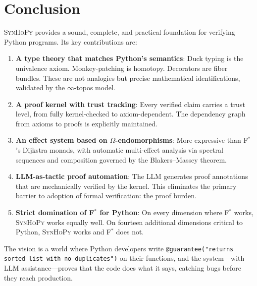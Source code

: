 \documentclass[11pt,a4paper]{report}
\theoremstyle{definition}
\theoremstyle{plain}
\newcommand{\fstar}{F$^{*}$}
\newcommand{\synhopy}{\textsc{SynHoPy}}
\begin{document}

\chapter*{Conclusion}

\synhopy{} provides a sound, complete, and practical foundation for verifying
Python programs. Its key contributions are:

\begin{enumerate}
  \item \textbf{A type theory that matches Python's semantics}: Duck typing
    is the univalence axiom. Monkey-patching is homotopy. Decorators are fiber
    bundles. These are not analogies but precise mathematical identifications,
    validated by the $\infty$-topos model.

  \item \textbf{A proof kernel with trust tracking}: Every verified claim
    carries a trust level, from fully kernel-checked to axiom-dependent.
    The dependency graph from axioms to proofs is explicitly maintained.

  \item \textbf{An effect system based on $\Omega$-endomorphisms}: More
    expressive than \fstar{}'s Dijkstra monads, with automatic multi-effect
    analysis via spectral sequences and composition governed by the
    Blakers--Massey theorem.

  \item \textbf{LLM-as-tactic proof automation}: The LLM generates proof
    annotations that are mechanically verified by the kernel. This eliminates
    the primary barrier to adoption of formal verification: the proof burden.

  \item \textbf{Strict domination of \fstar{} for Python}: On every dimension
    where \fstar{} works, \synhopy{} works equally well. On fourteen additional
    dimensions critical to Python, \synhopy{} works and \fstar{} does not.
\end{enumerate}

The vision is a world where Python developers write
\lstinline[style=synhopy]{@guarantee("returns sorted list with no duplicates")}
on their functions, and the system---with LLM assistance---proves that the
code does what it says, catching bugs before they reach production.
\end{document}

